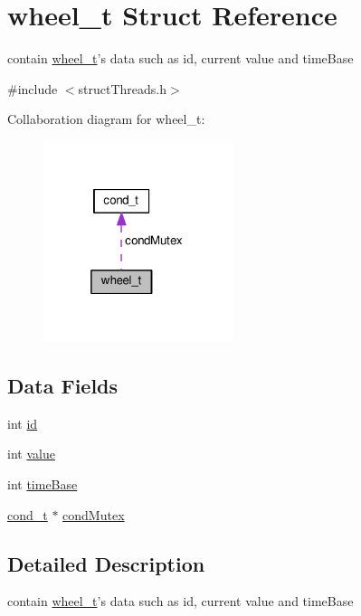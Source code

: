 \hypertarget{structwheel__t}{\section{wheel\+\_\+t Struct Reference}
\label{structwheel__t}
}


contain \hyperlink{structwheel__t}{wheel\+\_\+t}'s data such as id, current value and time\+Base  




{\ttfamily \#include $<$struct\+Threads.\+h$>$}



Collaboration diagram for wheel\+\_\+t\+:\nopagebreak
\begin{figure}[H]
\begin{center}
\leavevmode
\includegraphics[width=157pt]{structwheel__t__coll__graph}
\end{center}
\end{figure}
\subsection*{Data Fields}
\begin{DoxyCompactItemize}
\item 
int \hyperlink{structwheel__t_a7441ef0865bcb3db9b8064dd7375c1ea}{id}
\item 
int \hyperlink{structwheel__t_ac4f474c82e82cbb89ca7c36dd52be0ed}{value}
\item 
int \hyperlink{structwheel__t_a782adf457267a648e01dbf13d8a16181}{time\+Base}
\item 
\hyperlink{structcond__t}{cond\+\_\+t} $\ast$ \hyperlink{structwheel__t_a24715ed40b477ab5d0426f24cb9e4514}{cond\+Mutex}
\end{DoxyCompactItemize}


\subsection{Detailed Description}
contain \hyperlink{structwheel__t}{wheel\+\_\+t}'s data such as id, current value and time\+Base 

